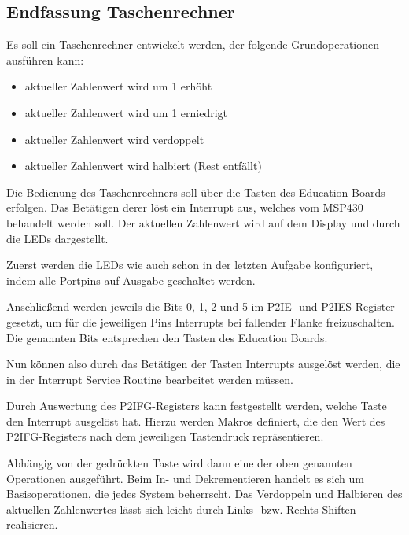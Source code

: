 \documentclass[12pt,a4paper,bibliography=totocnumbered,listof=totocnumbered]{scrartcl}
\begin{document}
\pagebreak

\subsection{Endfassung Taschenrechner}
\label{Taschenrechner}
Es soll ein Taschenrechner entwickelt werden, der folgende Grundoperationen ausführen kann:
\begin{itemize}
	\item aktueller Zahlenwert wird um 1 erhöht
	\item aktueller Zahlenwert wird um 1 erniedrigt
	\item aktueller Zahlenwert wird verdoppelt
	\item aktueller Zahlenwert wird halbiert (Rest entfällt)
\end{itemize}
Die Bedienung des Taschenrechners soll über die Tasten des Education Boards erfolgen. Das Betätigen derer löst ein Interrupt aus, welches vom MSP430 behandelt werden soll. Der aktuellen Zahlenwert wird auf dem Display und durch die LEDs dargestellt.

Zuerst werden die LEDs wie auch schon in der letzten Aufgabe konfiguriert, indem alle Portpins auf Ausgabe geschaltet werden.

Anschließend werden jeweils die Bits 0, 1, 2 und 5 im P2IE- und P2IES-Register gesetzt, um für die jeweiligen Pins Interrupts bei fallender Flanke freizuschalten. Die genannten Bits entsprechen den Tasten des Education Boards.

\vspace{1em}


Nun können also durch das Betätigen der Tasten Interrupts ausgelöst werden, die in der Interrupt Service Routine bearbeitet werden müssen.

Durch Auswertung des P2IFG-Registers kann festgestellt werden, welche Taste den Interrupt ausgelöst hat. Hierzu werden Makros definiert, die den Wert des P2IFG-Registers nach dem jeweiligen Tastendruck repräsentieren.

\vspace{1em}


\vspace{1em}


Abhängig von der gedrückten Taste wird dann eine der oben genannten Operationen ausgeführt. Beim In- und Dekrementieren handelt es sich um Basisoperationen, die jedes System beherrscht. Das Verdoppeln und Halbieren des aktuellen Zahlenwertes lässt sich leicht durch Links- bzw. Rechts-Shiften realisieren.
\end{document}

